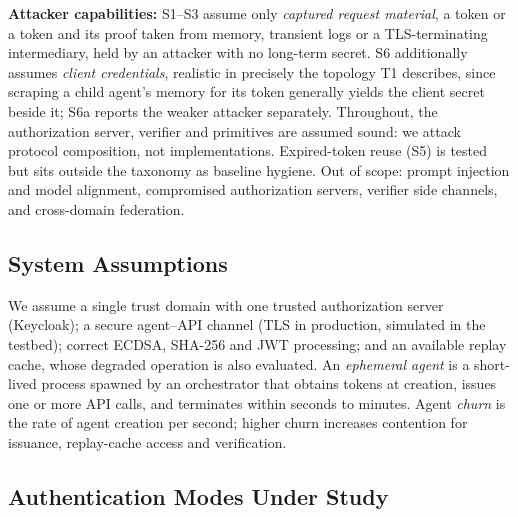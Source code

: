 \documentclass[conference]{IEEEtran}
\begin{document}
\textbf{Attacker capabilities:} S1--S3 assume only \emph{captured request material}, a token or a token and its proof taken from memory, transient logs or a TLS-terminating intermediary, held by an attacker with no long-term secret. S6 additionally assumes \emph{client credentials}, realistic in precisely the topology T1 describes, since scraping a child agent's memory for its token generally yields the client secret beside it; S6a reports the weaker attacker separately. Throughout, the authorization server, verifier and primitives are assumed sound: we attack protocol composition, not implementations. Expired-token reuse (S5) is tested but sits outside the taxonomy as baseline hygiene. Out of scope: prompt injection and model alignment, compromised authorization servers, verifier side channels, and cross-domain federation.

\subsection{System Assumptions}

We assume a single trust domain with one trusted authorization server (Keycloak); a secure agent--API channel (TLS in production, simulated in the testbed); correct ECDSA, SHA-256 and JWT processing; and an available replay cache, whose degraded operation is also evaluated. An \textit{ephemeral agent} is a short-lived process spawned by an orchestrator that obtains tokens at creation, issues one or more API calls, and terminates within seconds to minutes. Agent \textit{churn} is the rate of agent creation per second; higher churn increases contention for issuance, replay-cache access and verification.

\subsection{Authentication Modes Under Study}
\end{document}
